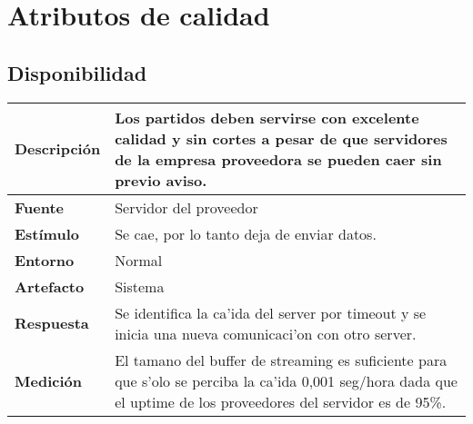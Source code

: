 \section{Atributos de calidad}


\subsection{Disponibilidad}

\begin{center}
  \begin{tabular}{| l | p{10cm} | }
    \hline
  \textbf{Descripción} & Los partidos deben servirse con excelente calidad y sin cortes a pesar de que servidores de la empresa proveedora se pueden caer sin previo aviso.\\  \hline
  \textbf{Fuente} & Servidor del proveedor\\  \hline
  \textbf{Estímulo} & Se cae, por lo tanto deja de enviar datos.\\  \hline
  \textbf{Entorno} & Normal\\  \hline
  \textbf{Artefacto} & Sistema\\  \hline
  \textbf{Respuesta} & Se identifica la ca'ida del server por timeout y se inicia una nueva comunicaci'on con otro server.\\  \hline
  \textbf{Medición} & El tamano del buffer de streaming es suficiente para que s'olo se perciba la ca'ida 0,001 seg/hora dada que el uptime de los proveedores del servidor es de 95\%.\\  \hline
  \end{tabular}
\end{center} 


